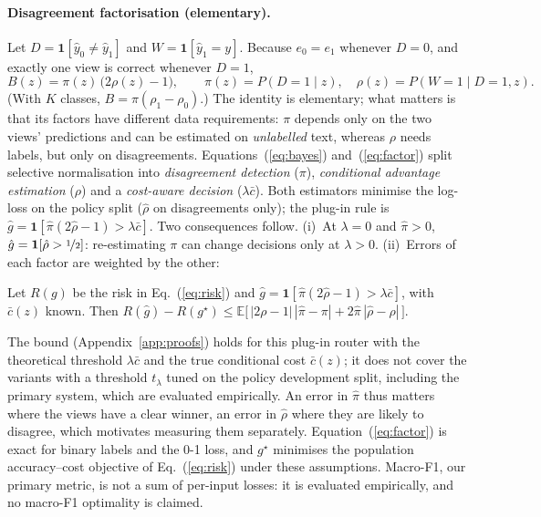 \paragraph{Disagreement factorisation (elementary).}
Let $D=\mathbf 1[\hat y_0\neq\hat y_1]$ and $W=\mathbf 1[\hat y_1=y]$. Because $e_0=e_1$ whenever $D=0$, and exactly one view is correct whenever $D=1$,
\begin{equation}
B(z)=\pi(z)\,\big(2\rho(z)-1\big),\qquad \pi(z)=P(D{=}1\mid z),\quad \rho(z)=P(W{=}1\mid D{=}1,z).
\label{eq:factor}
\end{equation}
(With $K$ classes, $B=\pi(\rho_1-\rho_0)$.) The identity is elementary; what matters is that its factors have different data requirements: $\pi$ depends only on the two views' predictions and can be estimated on \emph{unlabelled} text, whereas $\rho$ needs labels, but only on disagreements. Equations~(\ref{eq:bayes}) and~(\ref{eq:factor}) split selective normalisation into \emph{disagreement detection} ($\pi$), \emph{conditional advantage estimation} ($\rho$) and a \emph{cost-aware decision} ($\lambda\bar c$). Both estimators minimise the log-loss on the policy split ($\hat\rho$ on disagreements only); the plug-in rule is $\hat g=\mathbf 1[\hat\pi(2\hat\rho-1)>\lambda\bar c]$. Two consequences follow. (i)~At $\lambda=0$ and $\hat\pi>0$, $\hat g=\mathbf 1[\hat\rho>\nicefrac12]$: re-estimating $\pi$ can change decisions only at $\lambda>0$. (ii)~Errors of each factor are weighted by the other:

\begin{proposition}
\label{prop:regret}
Let $R(g)$ be the risk in Eq.~(\ref{eq:risk}) and $\hat g=\mathbf 1[\hat\pi(2\hat\rho-1)>\lambda\bar c]$, with $\bar c(z)$ known. Then $R(\hat g)-R(g^\star)\le\mathbb E\big[\,|2\rho-1|\,|\hat\pi-\pi|+2\hat\pi\,|\hat\rho-\rho|\,\big]$.
\end{proposition}
The bound (Appendix~\ref{app:proofs}) holds for this plug-in router with the theoretical threshold $\lambda\bar c$ and the true conditional cost $\bar c(z)$; it does not cover the variants with a threshold $t_\lambda$ tuned on the policy development split, including the primary system, which are evaluated empirically. An error in $\hat\pi$ thus matters where the views have a clear winner, an error in $\hat\rho$ where they are likely to disagree, which motivates measuring them separately. Equation~(\ref{eq:factor}) is exact for binary labels and the 0-1 loss, and $g^\star$ minimises the population accuracy--cost objective of Eq.~(\ref{eq:risk}) under these assumptions. Macro-F1, our primary metric, is not a sum of per-input losses: it is evaluated empirically, and no macro-F1 optimality is claimed.

